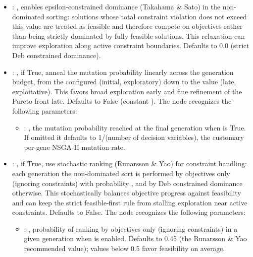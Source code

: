 \begin{itemize}
    \item {}: ,
      enables epsilon-constrained dominance (Takahama \& Sato) in the non-dominated sorting:
      solutions whose total constraint violation does not exceed this value are treated as
      feasible and therefore compete on objectives rather than being strictly dominated by
      fully feasible solutions. This relaxation can improve exploration along active
      constraint boundaries. Defaults to 0.0 (strict Deb constrained dominance).

    \item {}: ,
      if True, anneal the mutation probability linearly across the generation budget, from the
      configured  (initial, exploratory) down to the 
      value (late, exploitative). This favors broad exploration early and fine refinement of
      the Pareto front late. Defaults to False (constant ).
      The  node recognizes the following parameters:
        \begin{itemize}
          \item {}: ,
            the mutation probability reached at the final generation when 
            is True. If omitted it defaults to 1/(number of decision variables), the customary
            per-gene NSGA-II mutation rate.
      \end{itemize}

    \item {}: ,
      if True, use stochastic ranking (Runarsson \& Yao) for constraint handling: each
      generation the non-dominated sort is performed by objectives only (ignoring
      constraints) with probability , and by Deb constrained dominance otherwise.
      This stochastically balances objective progress against feasibility and can keep the
      strict feasible-first rule from stalling exploration near active constraints. Defaults
      to False.
      The  node recognizes the following parameters:
        \begin{itemize}
          \item {}: ,
            probability of ranking by objectives only (ignoring constraints) in a given generation
            when  is enabled. Defaults to 0.45 (the Runarsson \& Yao
            recommended value); values below 0.5 favor feasibility on average.
      \end{itemize}


\end{itemize}
